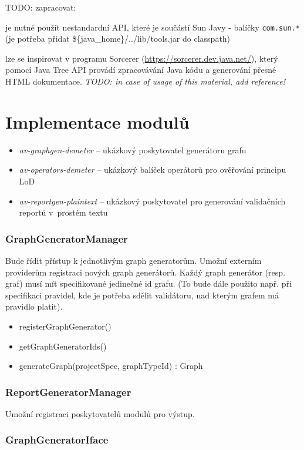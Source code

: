 TODO: zapracovat:

je nutné použít nestandardní API, které je součástí Sun Javy - balíčky \verb+com.sun.*+ (je potřeba přidat \$\{java\_home\}/../lib/tools.jar do classpath)

lze se inspirovat v programu Sorcerer (\href{https://sorcerer.dev.java.net/}{https://sorcerer.dev.java.net/}), který pomocí Java Tree API provádí zpracovávání Java kódu a generování přesné HTML dokumentace. \emph{TODO: in case of usage of this material, add reference!}

\section{Implementace modulů}

\begin{itemize}
\item \emph{av-graphgen-demeter} -- ukázkový poskytovatel generátoru grafu
\item \emph{av-operators-demeter} -- ukázkový balíček operátorů pro ověřování principu LoD
\item \emph{av-reportgen-plaintext} -- ukázkový poskytovatel pro generování validačních reportů v~prostém textu
\end{itemize}

\subsubsection{GraphGeneratorManager}
Bude řídit přístup k jednotlivým graph generatorům. Umožní externím providerům registraci nových graph generátorů. Každý graph generátor (resp. graf) musí mít specifikované jedinečné id grafu. (To bude dále použito např. při specifikaci pravidel, kde je potřeba sdělit validátoru, nad kterým grafem má pravidlo platit).
\begin{itemize}
\item registerGraphGenerator()
\item getGraphGeneratorIds()
\item generateGraph(projectSpec, graphTypeId) : Graph
\end{itemize}

\subsubsection{ReportGeneratorManager}
Umožní registraci poskytovatelů modulů pro výstup.

\subsubsection{GraphGeneratorIface}
